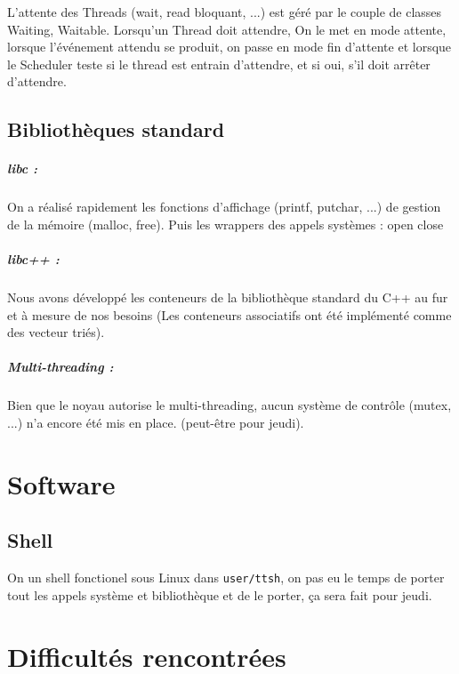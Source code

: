 \documentclass[12pt]{report}
\begin{document}
L'attente des Threads (wait, read bloquant, ...) est géré par le couple de
classes Waiting, Waitable. Lorsqu'un Thread doit attendre, On le met en mode
attente, lorsque l'événement attendu se produit, on passe en mode fin d'attente
et lorsque le Scheduler teste si le thread est entrain d'attendre, et si oui,
s'il doit arrêter d'attendre. 


\section{Bibliothèques standard}

\paragraph{libc :} On a réalisé rapidement les fonctions d'affichage (printf,
putchar, ...) de gestion de la mémoire (malloc, free).
Puis les wrappers des appels systèmes : open close

\paragraph{libc++ :} Nous avons développé les conteneurs de la bibliothèque
standard du C++ au fur et à mesure de nos besoins (Les conteneurs associatifs
ont été implémenté comme des vecteur triés).

\paragraph{Multi-threading :} Bien que le noyau autorise le multi-threading,
aucun système de contrôle (mutex, ...) n'a encore été mis en place. (peut-être pour jeudi).

\chapter{Software}

\section{Shell} On un shell fonctionel sous Linux dans \verb$user/ttsh$, on pas
eu le temps de porter tout les appels système et bibliothèque et de le porter,
ça sera fait pour jeudi.

\chapter{Difficultés rencontrées}
\end{document}
